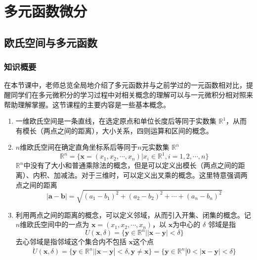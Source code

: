 \section{多元函数微分}
\subsection{欧氏空间与多元函数}
\subsubsection{知识概要}
在本节课中，老师总览全局地介绍了多元函数并与之前学过的一元函数相对比，提醒同学们在多元微积分的学习过程中对相关概念的理解可以与一元微积分相对照来帮助理解掌握。这节课程的主要内容是一些基本概念。

\begin{enumerate}
\item 一维欧氏空间是一条直线，在选定原点和单位长度后等同于实数集 $\mathbb{R}^1$，从而有模长（两点之间的距离），大小关系，四则运算和区间的概念。

\item $n$维欧氏空间在确定直角坐标系后等同于$n$元实数集 $\mathbb{R}^n$
$$
\mathbb{R}^n = \{\mathbf{x} = (x_1,x_2,\cdots,x_n)|x_i \in \mathbb{R}^1,i = 1,2,\cdots,n\}
$$
$\mathbb{R}^n$中没有了大小和普通乘除法的概念，但是可以定义出模长（两点之间的距离）、内积、加减法。对于三维时，可以定义出叉乘的概念。这里特意强调两点之间的距离
$$
|\mathbf{a}-\mathbf{b}| = \sqrt{(a_1-b_1)^2+(a_2-b_2)^2+\cdots+(a_n-b_n)^2}
$$

\item 利用两点之间的距离的概念，可以定义邻域，从而引入开集、闭集的概念。记 $n$维欧氏空间中的一点为 $\mathbf{x} =(x_1,x_2,\cdots,x_n) $，以 $\mathbf{x}$为中心的 $\delta$ 邻域是指
$$
U(\mathbf{x},\delta) = \{\mathbf{y} \in \mathbb{R}^n| |\mathbf{x} - \mathbf{y}|<\delta \}
$$
去心邻域是指邻域这个集合内不包括 $\mathbf{x}$这个点
$$
\mathring{U}(\mathbf{x},\delta) = \{\mathbf{y} \in \mathbb{R}^n| |\mathbf{x} - \mathbf{y}|<\delta, \mathbf{y} \neq \mathbf{x} \} = \{\mathbf{y} \in \mathbb{R}^n| 0<|\mathbf{x} - \mathbf{y}|<\delta \}
$$


\end{enumerate}
